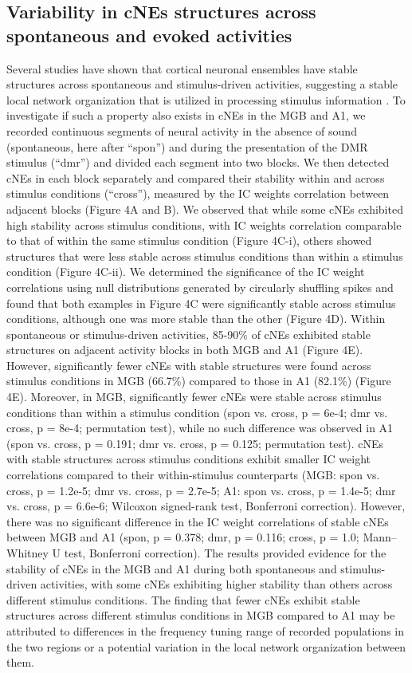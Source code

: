 \documentclass[11pt]{article}
\begin{document}
\subsection*{Variability in cNEs structures across spontaneous and evoked activities}
Several studies have shown that cortical neuronal ensembles have stable structures across spontaneous and stimulus-driven activities, suggesting a stable local network organization that is utilized in processing stimulus information \citep{jermakowicz2009relationship, luczak2009spontaneous, See2018, Filipchuk2022}. To investigate if such a property also exists in cNEs in the MGB and A1, we recorded continuous segments of neural activity in the absence of sound (spontaneous, here after “spon”) and during the presentation of the DMR stimulus (“dmr”) and divided each segment into two blocks. We then detected cNEs in each block separately and compared their stability within and across stimulus conditions (“cross”), measured by the IC weights correlation between adjacent blocks (Figure 4A and B). We observed that while some cNEs exhibited high stability across stimulus conditions, with IC weights correlation comparable to that of within the same stimulus condition (Figure 4C-i), others showed structures that were less stable across stimulus conditions than within a stimulus condition (Figure 4C-ii). We determined the significance of the IC weight correlations using null distributions generated by circularly shuffling spikes and found that both examples in Figure 4C were significantly stable across stimulus conditions, although one was more stable than the other (Figure 4D). Within spontaneous or stimulus-driven activities, 85-90\% of cNEs exhibited stable structures on adjacent activity blocks in both MGB and A1 (Figure 4E). However, significantly fewer cNEs with stable structures were found across stimulus conditions in MGB (66.7\%) compared to those in A1 (82.1\%) (Figure 4E). Moreover, in MGB, significantly fewer cNEs were stable across stimulus conditions than within a stimulus condition (spon vs. cross, p = 6e-4; dmr vs. cross, p = 8e-4; permutation test), while no such difference was observed in A1 (spon vs. cross, p = 0.191; dmr vs. cross, p = 0.125; permutation test). cNEs with stable structures across stimulus conditions exhibit smaller IC weight correlations compared to their within-stimulus counterparts (MGB: spon vs. cross, p = 1.2e-5; dmr vs. cross, p = 2.7e-5; A1: spon vs. cross, p = 1.4e-5; dmr vs. cross, p = 6.6e-6; Wilcoxon signed-rank test, Bonferroni correction). However, there was no significant difference in the IC weight correlations of stable cNEs between MGB and A1 (spon, p = 0.378; dmr, p = 0.116; cross, p = 1.0; Mann–Whitney U test, Bonferroni correction). The results provided evidence for the stability of cNEs in the MGB and A1 during both spontaneous and stimulus-driven activities, with some cNEs exhibiting higher stability than others across different stimulus conditions. The finding that fewer cNEs exhibit stable structures across different stimulus conditions in MGB compared to A1 may be attributed to differences in the frequency tuning range of recorded populations in the two regions or a potential variation in the local network organization between them.
\end{document}
